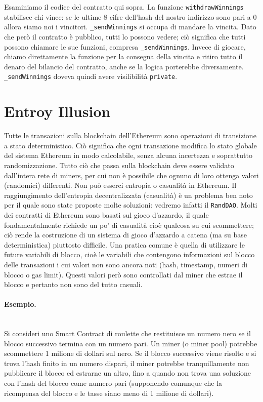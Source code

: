 Esaminiamo il codice del contratto qui sopra.
La funzione \verb|withdrawWinnings| stabilisce chi
vince: se le ultime 8 cifre dell'hash
del nostro indirizzo sono pari a $0$
allora siamo noi i vincitori.
\verb|_sendWinnings| si occupa di
mandare la vincita.
Dato che però il contratto è
pubblico, tutti lo possono vedere;
ciò significa che tutti possono chiamare le sue funzioni, compresa
\verb|_sendWinnings|.
Invece di giocare, chiamo direttamente la funzione per la consegna della vincita e
ritiro tutto
il denaro del bilancio del contratto, anche se la logica porterebbe diversamente.
\verb|_sendWinnings| doveva quindi avere visilibilità \verb|private|.

\section{Entroy Illusion}

Tutte le transazioni sulla blockchain dell'Ethereum sono operazioni di
transizione a stato deterministico. Ciò significa che ogni transazione
modifica lo stato globale del sistema
Ethereum in modo calcolabile, senza alcuna incertezza e soprattutto randomizzazione.
Tutto ciò che passa sulla blockchain deve essere validato dall'intera rete di
miners, per cui non è
possibile che ognuno di loro ottenga valori (randomici) differenti.
Non può esserci entropia o
casualità in Ethereum.
Il raggiungimento dell'entropia decentralizzata (casualità) è un problema ben noto
per il
quale sono state proposte molte soluzioni: vedremo infatti il \verb|RandDAO|.
Molti dei contratti di Ethereum sono basati sul gioco d'azzardo, il quale
fondamentalmente
richiede un po' di casualità cioè qualcosa su cui scommettere;
ciò rende la costruzione di un
sistema di gioco d'azzardo a catena (ma su base deterministica) piuttosto difficile.
Una pratica comune è quella di utilizzare le future variabili di blocco,
cioè le variabili che
contengono informazioni sul blocco delle transazioni i cui valori non sono ancora
noti (hash, timestamp, numeri di blocco o gas limit).
Questi valori però sono controllati dal miner che
estrae il blocco e pertanto non sono del tutto casuali.

\paragraph{Esempio.}\ \\

Si consideri uno Smart Contract di roulette che restituisce un numero nero se il
blocco successivo termina con un numero pari.
Un miner (o miner pool) potrebbe scommettere 1 milione di dollari sul nero.
Se il blocco
successivo viene risolto e si trova l'hash finito in un numero dispari,
il miner potrebbe
tranquillamente non pubblicare il blocco ed estrarne un altro,
fino a quando non trova una
soluzione con l'hash del blocco come numero pari (supponendo comunque che la
ricompensa del blocco e le tasse siano meno di 1 milione di dollari).

